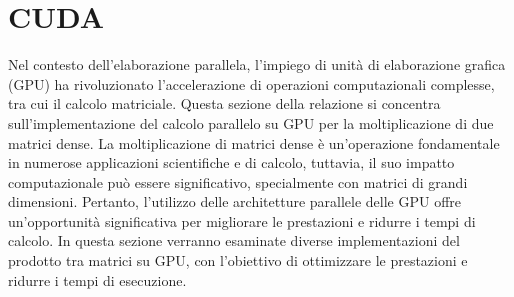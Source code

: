 \documentclass[conference]{IEEEtran}
\begin{document}
\section{CUDA}
Nel contesto dell'elaborazione parallela, l'impiego di unità di elaborazione grafica (GPU) ha rivoluzionato l'accelerazione di operazioni computazionali complesse, tra cui il calcolo matriciale. Questa sezione della relazione si concentra sull'implementazione del calcolo parallelo su GPU per la moltiplicazione di due matrici dense. La moltiplicazione di matrici dense è un'operazione fondamentale in numerose applicazioni scientifiche e di calcolo, tuttavia, il suo impatto computazionale può essere significativo, specialmente con matrici di grandi dimensioni. Pertanto, l'utilizzo delle architetture parallele delle GPU offre un'opportunità significativa per migliorare le prestazioni e ridurre i tempi di calcolo. In questa sezione verranno esaminate diverse implementazioni del prodotto tra matrici su GPU, con l'obiettivo di ottimizzare le prestazioni e ridurre i tempi di esecuzione.
\end{document}
